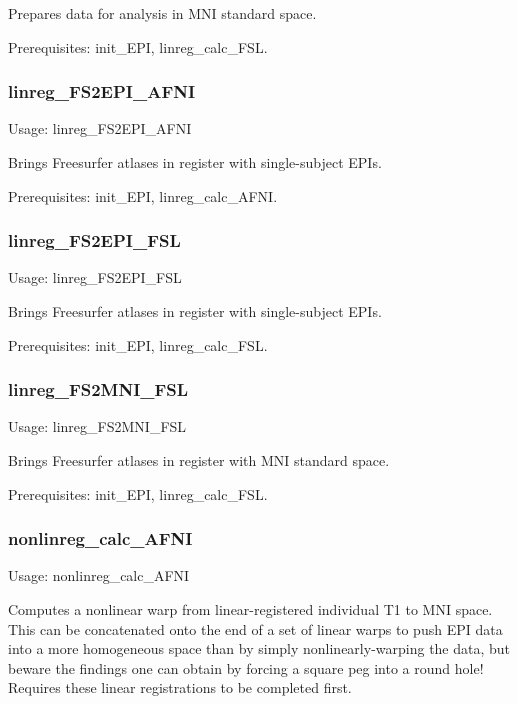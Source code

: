 \documentclass[final,titlepage,letterpaper,oneside,12pt]{article}
\renewcommand{\texttt}[2][BrickRed]{\textcolor{#1}{\ttfamily #2}}%
\begin{document}
\noindent Prepares data for analysis in MNI standard space.

Prerequisites: \texttt{init\_EPI}, \texttt{linreg\_calc\_FSL}.

\subsubsection{linreg\_FS2EPI\_AFNI}
Usage: \texttt{linreg\_FS2EPI\_AFNI}

\noindent Brings Freesurfer atlases in register with single-subject EPIs.

Prerequisites: \texttt{init\_EPI}, \texttt{linreg\_calc\_AFNI}.

\subsubsection{linreg\_FS2EPI\_FSL}
Usage: \texttt{linreg\_FS2EPI\_FSL}

\noindent Brings Freesurfer atlases in register with single-subject EPIs.

Prerequisites: \texttt{init\_EPI}, \texttt{linreg\_calc\_FSL}.

\subsubsection{linreg\_FS2MNI\_FSL}
Usage: \texttt{linreg\_FS2MNI\_FSL}

\noindent Brings Freesurfer atlases in register with MNI standard space.

Prerequisites: \texttt{init\_EPI}, \texttt{linreg\_calc\_FSL}.


\subsubsection{nonlinreg\_calc\_AFNI}
Usage: \texttt{nonlinreg\_calc\_AFNI}

\noindent Computes a nonlinear warp from linear-registered individual T1 to MNI space. This can be concatenated onto the end of a set of linear warps to push EPI data into a more homogeneous space than by simply nonlinearly-warping the data, but beware the findings one can obtain by forcing a square peg into a round hole! Requires these linear registrations to be completed first.
\end{document}
